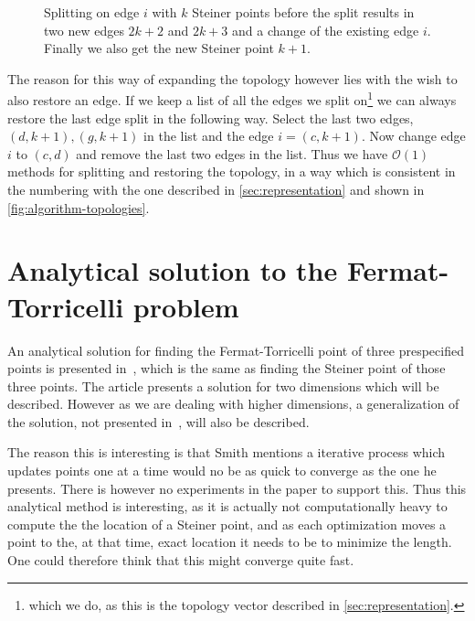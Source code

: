 \begin{figure}[htbp]
  \centering
  
  \caption[Implementation of topology splitting]{Splitting on edge $i$ with $k$ Steiner points before the
    split results in two new edges $2k+2$ and $2k+3$ and a change of the existing edge $i$. Finally we
  also get the new Steiner point $k + 1$.\label{fig:splitting-topology}}
\end{figure}

The reason for this way of expanding the topology however lies with the wish to
also restore an edge. If we keep a list of all the edges we split
on\footnote{which we do, as this is the topology vector described in
  \cref{sec:representation}.} we can always restore the last edge split in the
following way. Select the last two edges, $(d, k+1), (g, k+1)$ in the list and
the edge $i = (c, k+1)$. Now change edge $i$ to $(c, d)$ and remove the last
two edges in the list. Thus we have $\mathcal{O}(1)$ methods for splitting and
restoring the topology, in a way which is consistent in the numbering with the
one described in \cref{sec:representation} and shown in
\cref{fig:algorithm-topologies}.


\section{Analytical solution to the Fermat-Torricelli problem}
\label{sec:analyt-solut-ferm}

An analytical solution for finding the Fermat-Torricelli point of three
prespecified points is presented in~\cite{uteshev2012}, which is the same as
finding the Steiner point of those three points. The article presents a
solution for two dimensions which will be described. However as we are dealing
with  higher dimensions, a generalization of the solution, not presented
in~\cite{uteshev2014}, will also be described.

The reason this is interesting is that Smith mentions a iterative process which
updates points one at a time would no be as quick to converge as the one he
presents. There is however no experiments in the paper to support this. Thus
this analytical method is interesting, as it is actually not computationally
heavy to compute the the location of a Steiner point, and as each optimization
moves a point to the, at that time, exact location it needs to be to minimize
the length. One could therefore think that this might converge quite fast.

